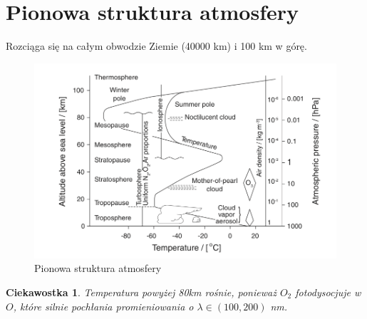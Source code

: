\documentclass{article}
\theoremstyle{plain}
\newtheorem{ciekaw}{Ciekawostka}
\begin{document}
\section{Pionowa struktura atmosfery}
Rozciąga się na całym obwodzie Ziemie (40000 km) i 100 km w górę.
\begin{figure}[h]
\begin{center}
	\includegraphics[width=0.7\linewidth]{images/Figure2}
	\caption{Pionowa struktura atmosfery}
\end{center}
\end{figure}
\begin{ciekaw}
	Temperatura powyżej 80km rośnie, ponieważ $O_2$ fotodysocjuje w $O$, które silnie pochłania promieniowania o $\lambda \in(100,200)$ nm.	
\end{ciekaw}
\end{document}
